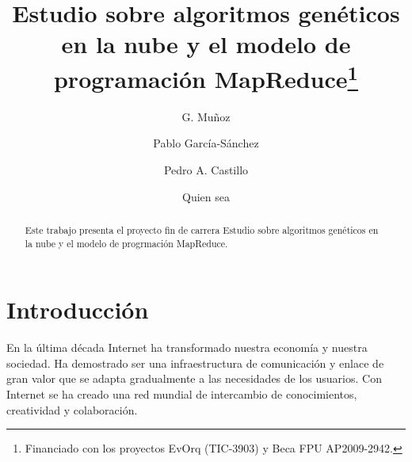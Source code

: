 \documentclass[runningheads]{llncs}
\begin{document}
 \pagestyle{empty} %
\mainmatter  %

\title{Estudio sobre algoritmos genéticos en la nube y el modelo de programación MapReduce\thanks{Financiado con los proyectos EvOrq (TIC-3903) y Beca FPU AP2009-2942. }}



%
%
\author{G. Mu\~noz  \and Pablo Garc\'ia-S\'anchez  \and Pedro A. Castillo  \and Quien sea }
%



%
%

\maketitle


\begin{abstract}
Este trabajo presenta el proyecto fin de carrera Estudio sobre algoritmos genéticos en la nube y el modelo de progrmación MapReduce.

\end{abstract}


\section{Introducción}
\noindent En la última década Internet ha transformado nuestra economía y nuestra sociedad. Ha demostrado ser una infraestructura de comunicación 
y enlace de gran valor que se adapta gradualmente a las necesidades de los usuarios. Con Internet se ha creado una red mundial de 
intercambio de conocimientos, creatividad y colaboración. 
\end{document}
